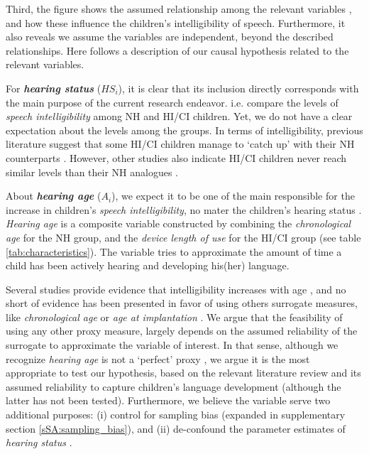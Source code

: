 Third, the figure shows the assumed relationship among the relevant variables \cite{Niparko_et_al_2010, Boons_et_al_2012, Gillis_2018, Fagan_et_al_2020}, and how these influence the children's intelligibility of speech. Furthermore, it also reveals we assume the variables are independent, beyond the described relationships. Here follows a description of our causal hypothesis related to the relevant variables.

For \textbf{\textit{hearing status}} ($HS_{i}$), it is clear that its inclusion directly corresponds with the main purpose of the current research endeavor. i.e. compare the levels of \textit{speech intelligibility} among NH and HI/CI children. Yet, we do not have a clear expectation about the levels among the groups. In terms of intelligibility, previous literature suggest that some HI/CI children manage to `catch up' with their NH counterparts \cite{Wie_2010, Habib_et_al_2010, Boons_et_al_2013, Geers_et_al_2013, Bruijnzeel_et_al_2016, Dettman_et_al_2016, Wie_et_al_2020}. However, other studies also indicate HI/CI children never reach similar levels than their NH analogues \cite{Nicholas_et_al_2007, Castellanos_et_al_2014, Chin_et_al_2014, Geers_et_al_2016, Freeman_et_al_2017, Duchesne_et_al_2019, Grandon_et_al_2020}. 

About \textbf{\textit{hearing age}} ($A_{i}$), we expect it to be one of the main responsible for the increase in children's \textit{speech intelligibility}, no mater the children's hearing status \cite{Boonen_et_al_2021}. \textit{Hearing age} is a composite variable constructed by combining the \textit{chronological age} for the NH group, and the \textit{device length of use} for the HI/CI group \citep{Faes_et_al_2021} (see table \ref{tab:characteristics}). The variable tries to approximate the amount of time a child has been actively hearing and developing his(her) language. 

Several studies provide evidence that intelligibility increases with age \cite{Chin_et_al_2001, Chin_et_al_2003, Flipsen_2006, Flipsen_2008, Baudonck_et_al_2009, Bowen_2011, Hustad_et_al_2020}, and no short of evidence has been presented in favor of using others surrogate measures, like \textit{chronological age} \cite{Flipsen_et_al_2006, Habib_et_al_2010, Grandon_et_al_2020} or \textit{age at implantation} \cite{Niparko_et_al_2010, Boons_et_al_2012, Bruijnzeel_et_al_2016, Dettman_et_al_2016}. We argue that the feasibility of using any other proxy measure, largely depends on the assumed reliability of the surrogate to approximate the variable of interest. In that sense, although we recognize \textit{hearing age} is not a `perfect' proxy \cite{Faes_et_al_2021}, we argue it is the most appropriate to test our hypothesis, based on the relevant literature review and its assumed reliability to capture children's language development (although the latter has not been tested). Furthermore, we believe the variable serve two additional purposes: (i) control for sampling bias (expanded in supplementary section \ref{sSA:sampling_bias}), and (ii) de-confound the parameter estimates of \textit{hearing status} \cite{Cinelli_et_al_2021}.

